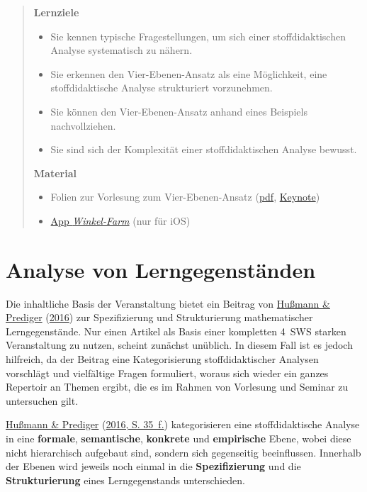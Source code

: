 \documentclass[
  ngerman,
]{scrbook}
\providecommand{\tightlist}{%
  \setlength{\itemsep}{0pt}\setlength{\parskip}{0pt}}
\theoremstyle{definition}
\theoremstyle{definition}
\theoremstyle{definition}
\theoremstyle{definition}
\theoremstyle{remark}
\begin{document}
\begin{quote}
\textbf{Lernziele}

\begin{itemize}
\tightlist
\item
  Sie kennen typische Fragestellungen, um sich einer stoffdidaktischen Analyse systematisch zu nähern.
\item
  Sie erkennen den Vier-Ebenen-Ansatz als eine Möglichkeit, eine stoffdidaktische Analyse strukturiert vorzunehmen.
\item
  Sie können den Vier-Ebenen-Ansatz anhand eines Beispiels nachvollziehen.
\item
  Sie sind sich der Komplexität einer stoffdidaktischen Analyse bewusst.
\end{itemize}

\textbf{Material}

\begin{itemize}
\tightlist
\item
  Folien zur Vorlesung zum Vier-Ebenen-Ansatz (\href{files/Stoffdidaktik-WiSe2122-Kap2.pdf}{pdf}, \href{files/Stoffdidaktik-WiSe2122-Kap2.key}{Keynote})
\item
  \href{https://apps.apple.com/de/app/winkel-farm/id1369585218}{App \emph{Winkel-Farm}} (nur für iOS)
\end{itemize}
\end{quote}

\hypertarget{analyse-von-lerngegenstuxe4nden}{%
\section{Analyse von Lerngegenständen}\label{analyse-von-lerngegenstuxe4nden}}

Die inhaltliche Basis der Veranstaltung bietet ein Beitrag von \protect\hyperlink{ref-Hussmann:2016}{Hußmann \& Prediger} (\protect\hyperlink{ref-Hussmann:2016}{2016}) zur Spezifizierung und Strukturierung mathematischer Lerngegenstände. Nur einen Artikel als Basis einer kompletten 4~SWS starken Veranstaltung zu nutzen, scheint zunächst unüblich. In diesem Fall ist es jedoch hilfreich, da der Beitrag eine Kategorisierung stoffdidaktischer Analysen vorschlägt und vielfältige Fragen formuliert, woraus sich wieder ein ganzes Repertoir an Themen ergibt, die es im Rahmen von Vorlesung und Seminar zu untersuchen gilt.

\protect\hyperlink{ref-Hussmann:2016}{Hußmann \& Prediger} (\protect\hyperlink{ref-Hussmann:2016}{2016, S. 35~f.}) kategorisieren eine stoffdidaktische Analyse in eine \textbf{\textcolor{formalColor}{formale}}, \textbf{\textcolor{semanticColor}{semantische}}, \textbf{\textcolor{concreteColor}{konkrete}} und \textbf{\textcolor{empiricColor}{empirische}} Ebene, wobei diese nicht hierarchisch aufgebaut sind, sondern sich gegenseitig beeinflussen. Innerhalb der Ebenen wird jeweils noch einmal in die \textbf{Spezifizierung} und die \textbf{Strukturierung} eines Lerngegenstands unterschieden.
\end{document}
